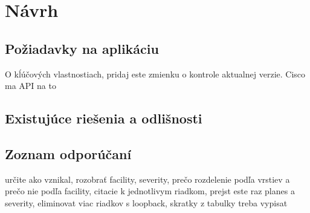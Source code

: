 \chapter{Návrh}

\section{Požiadavky na aplikáciu}
O kĺúčových vlastnostiach, pridaj este zmienku o kontrole aktualnej verzie. Cisco ma API na to

\section{Existujúce riešenia a odlišnosti}

\section{Zoznam odporúčaní}
 určite ako vznikal, rozobrať facility, severity, prečo rozdelenie podľa vrstiev a prečo nie podľa facility, citacie k jednotlivym riadkom, prejst este raz planes a severity, eliminovat viac riadkov s loopback, skratky z tabulky treba vypisat

